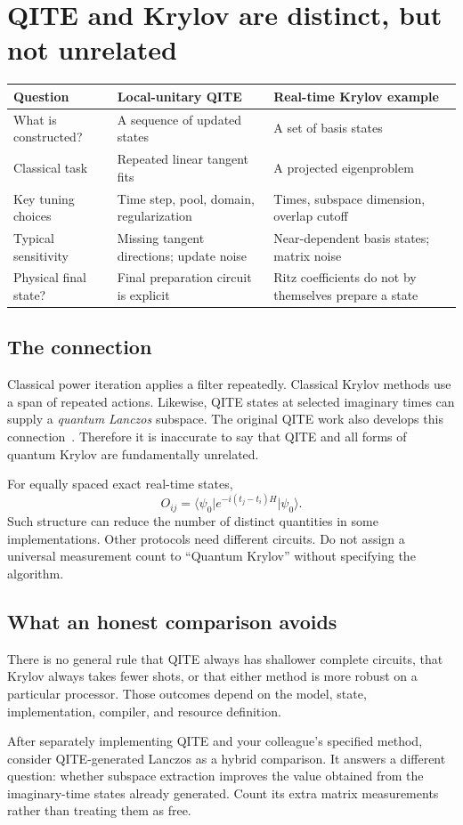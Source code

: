 \documentclass[11pt,a4paper]{article}
\newcommand{\ket}[1]{\lvert #1\rangle}
\newcommand{\bra}[1]{\langle #1\rvert}
\newcommand{\lesson}[2]{\clearpage\section{#1}\label{#2}}
\begin{document}
\lesson{QITE and Krylov are distinct, but not unrelated}{sec:comparison}
\begin{tabularx}{\linewidth}{@{}p{3.0cm}X X@{}}
\toprule
Question & Local-unitary QITE & Real-time Krylov example\\\midrule
What is constructed? & A sequence of updated states & A set of basis states\\
Classical task & Repeated linear tangent fits & A projected eigenproblem\\
Key tuning choices & Time step, pool, domain, regularization & Times, subspace dimension, overlap cutoff\\
Typical sensitivity & Missing tangent directions; update noise & Near-dependent basis states; matrix noise\\
Physical final state? & Final preparation circuit is explicit & Ritz coefficients do not by themselves prepare a state\\\bottomrule
\end{tabularx}

\subsection*{The connection}
Classical power iteration applies a filter repeatedly. Classical Krylov methods use a span of repeated actions. Likewise, QITE states at selected imaginary times can supply a \emph{quantum Lanczos} subspace. The original QITE work also develops this connection~\cite{motta}. Therefore it is inaccurate to say that QITE and all forms of quantum Krylov are fundamentally unrelated.

For equally spaced exact real-time states,
\[
O_{ij}=\bra{\psi_0}e^{-i(t_j-t_i)H}\ket{\psi_0}.
\]
Such structure can reduce the number of distinct quantities in some implementations. Other protocols need different circuits. Do not assign a universal measurement count to ``Quantum Krylov'' without specifying the algorithm.

\subsection*{What an honest comparison avoids}
There is no general rule that QITE always has shallower complete circuits, that Krylov always takes fewer shots, or that either method is more robust on a particular processor. Those outcomes depend on the model, state, implementation, compiler, and resource definition.

\begin{idea}
After separately implementing QITE and your colleague's specified method, consider QITE-generated Lanczos as a hybrid comparison. It answers a different question: whether subspace extraction improves the value obtained from the imaginary-time states already generated. Count its extra matrix measurements rather than treating them as free.
\end{idea}
\end{document}
